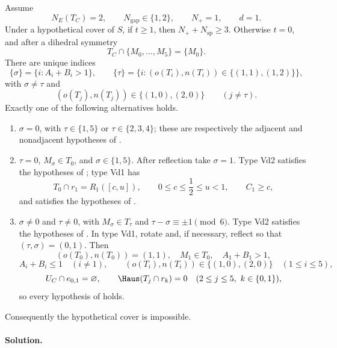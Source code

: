 \begin{lemma}
\label{lem:app-one-vd-placement-audit}
Assume
\[
 N_E(T_C)=2,
 \qquad N_{\mathrm{gap}}\in\{1,2\},
 \qquad N_+=1,
 \qquad d=1.
\]
Under a hypothetical cover of $S$, if $t\ge1$, then
$N_++N_{\mathrm{sp}}\ge3$.  Otherwise $t=0$, and after a dihedral symmetry
\[
 T_C\cap\{M_0,\ldots,M_5\}=\{M_0\}.
\]
There are unique indices
\[
 \{\sigma\}=\{i:A_i+B_i>1\},
 \qquad
 \{\tau\}=\{i:(o(T_i),n(T_i))\in\{(1,1),(1,2)\}\},
\]
with $\sigma\ne\tau$ and
\[
 (o(T_j),n(T_j))\in\{(1,0),(2,0)\}
 \qquad(j\ne\tau).
\]
Exactly one of the following alternatives holds.
\begin{enumerate}
\item $\sigma=0$, with $\tau\in\{1,5\}$ or
      $\tau\in\{2,3,4\}$; these are respectively the adjacent and
      nonadjacent hypotheses of
      .
\item $\tau=0$, $M_\sigma\in T_0$, and $\sigma\in\{1,5\}$.  After
      reflection take $\sigma=1$.  Type Vd2 satisfies the hypotheses of
      ; type Vd1 has
      \[
       T_0\cap r_1=R_1([c,u]),
       \qquad 0\le c\le\frac12\le u<1,
       \qquad C_1\ge c,
      \]
      and satisfies the hypotheses of
      .
\item $\sigma\ne0$ and $\tau\ne0$, with
      $M_\sigma\in T_\tau$ and
      $\tau-\sigma\equiv\pm1\pmod6$.  Type Vd2 satisfies the hypotheses of
      .  In type Vd1, rotate and, if
      necessary, reflect so that $(\tau,\sigma)=(0,1)$.  Then
      \[
       (o(T_0),n(T_0))=(1,1),
       \quad M_1\in T_0,
       \quad A_1+B_1>1,
      \]
      \[
       A_i+B_i\le1\quad(i\ne1),
       \qquad
       (o(T_i),n(T_i))\in\{(1,0),(2,0)\}\quad(1\le i\le5),
      \]
      \[
       U_C\cap e_{0,1}=\varnothing,
       \qquad
       \Haus(T_j\cap r_k)=0
       \quad(2\le j\le5,\ k\in\{0,1\}),
      \]
      so every hypothesis of  holds.
\end{enumerate}
Consequently the hypothetical cover is impossible.
\end{lemma}

\paragraph{Solution.}


